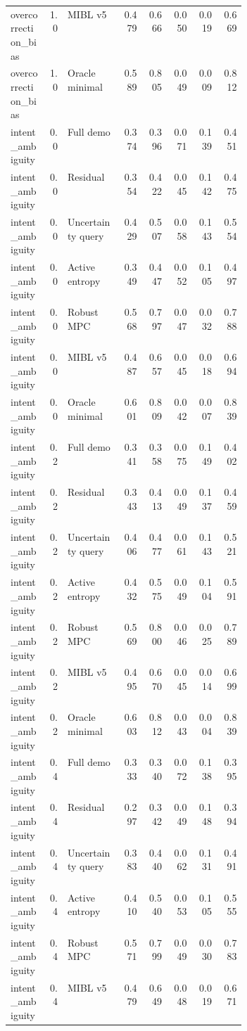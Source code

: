 \documentclass{article}
\begin{document}
\begin{center}
\begin{longtable}{p{0.16\linewidth}rp{0.23\linewidth}rrrrr}
overcorrection\_bias & 1.0 & MIBL v5 & 0.479 & 0.666 & 0.050 & 0.019 & 0.669\\
overcorrection\_bias & 1.0 & Oracle minimal & 0.589 & 0.805 & 0.049 & 0.009 & 0.812\\
intent\_ambiguity & 0.0 & Full demo & 0.374 & 0.396 & 0.071 & 0.139 & 0.451\\
intent\_ambiguity & 0.0 & Residual & 0.354 & 0.422 & 0.045 & 0.142 & 0.475\\
intent\_ambiguity & 0.0 & Uncertainty query & 0.429 & 0.507 & 0.058 & 0.143 & 0.554\\
intent\_ambiguity & 0.0 & Active entropy & 0.349 & 0.447 & 0.052 & 0.105 & 0.497\\
intent\_ambiguity & 0.0 & Robust MPC & 0.568 & 0.797 & 0.047 & 0.032 & 0.788\\
intent\_ambiguity & 0.0 & MIBL v5 & 0.487 & 0.657 & 0.045 & 0.018 & 0.694\\
intent\_ambiguity & 0.0 & Oracle minimal & 0.601 & 0.809 & 0.042 & 0.007 & 0.839\\
intent\_ambiguity & 0.2 & Full demo & 0.341 & 0.358 & 0.075 & 0.149 & 0.402\\
intent\_ambiguity & 0.2 & Residual & 0.343 & 0.413 & 0.049 & 0.137 & 0.459\\
intent\_ambiguity & 0.2 & Uncertainty query & 0.406 & 0.477 & 0.061 & 0.143 & 0.521\\
intent\_ambiguity & 0.2 & Active entropy & 0.432 & 0.575 & 0.049 & 0.104 & 0.591\\
intent\_ambiguity & 0.2 & Robust MPC & 0.569 & 0.800 & 0.046 & 0.025 & 0.789\\
intent\_ambiguity & 0.2 & MIBL v5 & 0.495 & 0.670 & 0.045 & 0.014 & 0.699\\
intent\_ambiguity & 0.2 & Oracle minimal & 0.603 & 0.812 & 0.043 & 0.004 & 0.839\\
intent\_ambiguity & 0.4 & Full demo & 0.333 & 0.340 & 0.072 & 0.138 & 0.395\\
intent\_ambiguity & 0.4 & Residual & 0.297 & 0.342 & 0.049 & 0.148 & 0.394\\
intent\_ambiguity & 0.4 & Uncertainty query & 0.383 & 0.440 & 0.062 & 0.131 & 0.491\\
intent\_ambiguity & 0.4 & Active entropy & 0.410 & 0.540 & 0.053 & 0.105 & 0.555\\
intent\_ambiguity & 0.4 & Robust MPC & 0.571 & 0.799 & 0.049 & 0.030 & 0.783\\
intent\_ambiguity & 0.4 & MIBL v5 & 0.479 & 0.649 & 0.048 & 0.019 & 0.671\\

\end{longtable}
\end{center}
\end{document}
